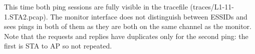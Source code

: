 This time both ping sessions are fully visible in the tracefile (traces/L1-11-1.STA2.pcap). The monitor interface does not distinguish between ESSIDs and sees pings in both of them as they are both on the same channel as the monitor. Note that the requests and replies have duplicates only for the second ping: the first is STA to AP so not repeated.

